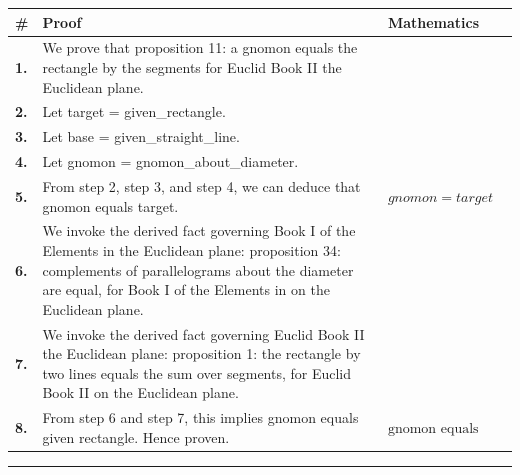 \documentclass[11pt]{article}
\theoremstyle{definition}
\begin{document}
\begin{tabular}{@{} >{\raggedright\arraybackslash}p{} >{\raggedright\arraybackslash}p{} >{\raggedleft\arraybackslash}p{} @{}}
\textbf{\#} & \textbf{Proof} & \textbf{Mathematics} \\
\midrule
\textbf{1.} & We prove that proposition 11: a gnomon equals the rectangle by the segments for Euclid Book II the Euclidean plane. & \\[0.45em]
\textbf{2.} & Let target = given\_rectangle. & \\[0.45em]
\textbf{3.} & Let base = given\_straight\_line. & \\[0.45em]
\textbf{4.} & Let gnomon = gnomon\_about\_diameter. & \\[0.45em]
\textbf{5.} & From step 2, step 3, and step 4, we can deduce that gnomon equals target. & $\displaystyle gnomon = target$ \\[0.45em]
\textbf{6.} & We invoke the derived fact governing Book I of the Elements in the Euclidean plane: proposition 34: complements of parallelograms about the diameter are equal, for Book I of the Elements in on the Euclidean plane. & \\[0.45em]
\textbf{7.} & We invoke the derived fact governing Euclid Book II the Euclidean plane: proposition 1: the rectangle by two lines equals the sum over segments, for Euclid Book II on the Euclidean plane. & \\[0.45em]
\textbf{8.} & From step 6 and step 7, this implies gnomon equals given rectangle. Hence proven. & $\displaystyle \text{gnomon equals given rectangle}$ \\[0.45em]
\bottomrule
\end{tabular}
\label{thm:Geometry-Euclid Book II-proposition_11_a_gnomon_equals_the_rectangle_by_the_segments}
\par\medskip\hrule
\end{document}
